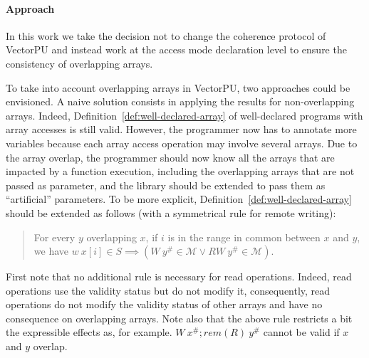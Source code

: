 \documentclass[preprint,12pt]{elsarticle}
\newcommand{\symb}[1]{\textit{#1}}
\newcommand{\rem}[1]{\symb{rem}(#1)}
\newcommand{\abs}[1]{#1^\#}
\newcommand{\AM}{\mathcal{M}}
\begin{document}
\paragraph{Approach}
In this work we take the decision not to change the coherence protocol of VectorPU and instead work at the access mode declaration level to ensure the consistency of overlapping arrays.

To take into account overlapping arrays in VectorPU, two approaches could be envisioned. A naive solution consists in applying the results for non-overlapping arrays. Indeed, Definition~\ref{def:well-declared-array} of well-declared programs with array accesses is still valid. However,  the programmer now has to annotate more variables because each array access operation may involve several arrays. Due to the array overlap, the programmer should now know all the arrays that are impacted by a function execution, including the overlapping arrays that are not passed as parameter, and the library should be extended to pass them as ``artificial'' parameters. To be more explicit, Definition~\ref{def:well-declared-array} should be extended as follows (with a symmetrical rule for remote writing):

\begin{quote}
For every $y$ overlapping $x$, if $i$ is in the range in common between $x$ and $y$, we have $w\ x[i]\in S \implies (W\ \abs y \in \AM \lor RW\ \abs y \in \AM)$.
\end{quote}

First note that no additional rule is necessary for read operations. Indeed, read operations use the validity status but do not modify it, consequently, read operations do not modify the validity status of other arrays and have no consequence on overlapping arrays.
Note also that the above rule restricts a bit the expressible effects as, for example. $W\ \abs x ; \rem{R}\ \abs y$ cannot be valid if $x$ and $y$ overlap.


\medskip
\end{document}
